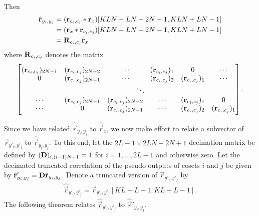 \documentclass[a4paper, openany, oneside]{memoir}
\begin{document}
Then
\begin{align*}
    \hat{\boldsymbol{\mathbf{r}}}_{y_i,y_j}
    &= (\boldsymbol{\mathbf{r}}_{c_i,c_j} \ast \boldsymbol{\mathbf{r}}_x)[KLN-LN+2N-1,KLN+LN-1]\\
    &= (\boldsymbol{\mathbf{r}}_x \ast \boldsymbol{\mathbf{r}}_{c_i,c_j})[KLN-LN+2N-1,KLN+LN-1] \\
    &= \boldsymbol{\mathbf{R}}_{c_i,c_j} \hat{\boldsymbol{\mathbf{r}}}_x
\end{align*}
where $\boldsymbol{\mathbf{R}}_{c_i,c_j}$ denotes the matrix
\begin{align*}
    \begin{bmatrix}
        (\vec{r}_{c_i,c_j})_{2N-1} & (\vec{r}_{c_i,c_j})_{2N-2} & \cdots & (\vec{r}_{c_i,c_j})_{1 }& 0 &  \cdots  \\
        0 & (\vec{r}_{c_i,c_j})_{2N-1} & \cdots & (\vec{r}_{c_i,c_j})_{2}& (\vec{r}_{c_i,c_j})_{1}  &\cdots  \\
        &&\multicolumn{2}{c}{\ddots} \\
        \cdots&(\vec{r}_{c_i,c_j})_{2N-1}&(\vec{r}_{c_i,c_j})_{2N-2}& \cdots & (\vec{r}_{c_i,c_j})_{1} & 0 \\
        \cdots&0&(\vec{r}_{c_i,c_j})_{2N-1}& \cdots & (\vec{r}_{c_i,c_j})_{2} & (\vec{r}_{c_i,c_j})_{1}
    \end{bmatrix}.
\end{align*}

Since we have related $\hat{\vec{r}}_{y_i,y_j}$ to $\hat{\vec{r}}_x$, we now make effort to relate a subvector of $\vec{r}_{y'_i,y'_j}$ to $\hat{\vec{r}}_{y_i,y_j}$. To this end, let the $2L-1\times 2LN-2N+1$ decimation matrix be defined by $(\boldsymbol{\mathbf{D}})_{i,(i-1)N+1} = 1$ for $i=1,\ldots,2L-1$ and otherwise zero. Let the decimated truncated correlation of the pseudo outputs of cosets $i$ and $j$ be given by $\hat{\boldsymbol{\mathbf{r}}}'_{y_i,y_j} = \boldsymbol{\mathbf{D}} \hat{\boldsymbol{\mathbf{r}}}_{y_i,y_j}$. Denote a truncated version of $\vec{r}_{y'_i,y'_j}$ by
\begin{align*}
    \hat{\vec{r}}_{y'_i,y'_j}=\vec{r}_{y'_i,y'_j}[KL-L+1,KL+L-1].
\end{align*}
The following theorem relates $\hat{\vec{r}}_{y'_i,y'_j}$ to $\hat{\vec{r}}'_{y_i,y_j}$.

\begin{blockTheorem} 
     \nolinebreak
\end{blockTheorem}
\end{document}
